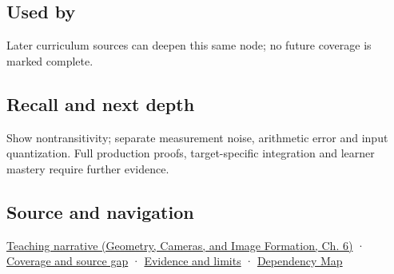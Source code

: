 \subsection{Used by}\label{appendix-b5b83329215b-used-by}

\hypertarget{appendix-b5b83329215b-used-by}{}

Later curriculum sources can deepen this same node; no future coverage is marked complete.

\subsection{Recall and next depth}\label{appendix-b5b83329215b-recall-and-next-depth}

\hypertarget{appendix-b5b83329215b-recall-and-next-depth}{}

Show nontransitivity; separate measurement noise, arithmetic error and input quantization. Full production proofs, target-specific integration and learner mastery require further evidence.

\subsection{Source and navigation}\label{appendix-b5b83329215b-source-and-navigation}

\hypertarget{appendix-b5b83329215b-source-and-navigation}{}

\href{../03-Geometry-Cameras-and-Image-Formation/main.pdf\#nameddest=02-foundations-ii-ch037-reliability-begins-at-the-boundary-of-the-calculation}{Teaching narrative (Geometry, Cameras, and Image Formation, Ch. 6)} · \hyperref[appendix-fd090d982a15-phase-6---parts-501-600]{Coverage and source gap} · \hyperref[appendix-a103e7846d21-phase-6---source-analysis-and-verification]{Evidence and limits} · \hyperref[appendix-4ad47bdd269a]{Dependency Map}
